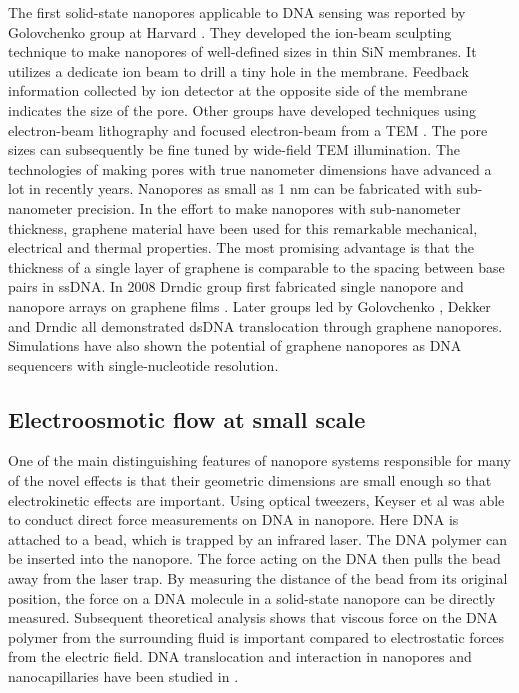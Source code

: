 The first solid-state nanopores applicable to DNA sensing was reported by Golovchenko group at Harvard \cite{Li2001}. They developed the ion-beam sculpting technique to make nanopores of well-defined sizes in thin SiN membranes. It utilizes a dedicate ion beam to drill a tiny hole in the membrane. Feedback information collected by ion detector at the opposite side of the membrane indicates the size of the pore. Other groups have developed techniques using electron-beam lithography and focused electron-beam from a TEM \cite{Dekker2003}. The pore sizes can subsequently be fine tuned by wide-field TEM illumination. The technologies of making pores with true nanometer dimensions have advanced a lot in recently years. Nanopores as small as 1 nm can be fabricated with sub-nanometer precision. In the effort to make nanopores with sub-nanometer thickness, graphene material have been used for this remarkable mechanical, electrical and thermal properties. The most promising advantage is that the thickness of a single layer of graphene is comparable to the spacing between base pairs in ssDNA. In 2008 Drndic group first fabricated single nanopore and nanopore arrays on graphene films \cite{fischbein2008electron}. Later groups led by Golovchenko \cite{Garaj2010}, Dekker \cite{Schneider2010} and Drndic \cite{Merchant2010} all demonstrated dsDNA translocation through graphene nanopores. Simulations have also shown the potential of graphene nanopores as DNA sequencers with single-nucleotide resolution.
\subsection{Electroosmotic flow at small scale}
One of the main distinguishing features of nanopore systems responsible for many of the novel effects is that their geometric dimensions are small enough so that electrokinetic effects are important. Using optical tweezers, Keyser et al \cite{Keyser2006,VanDorp2009} was able to conduct direct force measurements on DNA in nanopore. Here DNA is attached to a bead, which is trapped by an infrared laser. The DNA polymer can be inserted into the nanopore. The force acting on the DNA then pulls the bead away from the laser trap. By measuring the distance of the bead from its original position, the force on a DNA molecule in a solid-state nanopore can be directly measured. Subsequent theoretical analysis \cite{ghosal2006electrophoresis,ghosal2007effect,Ghosal2007} shows that viscous force on the DNA polymer from the surrounding fluid is important compared to electrostatic forces from the electric field. DNA translocation and interaction in nanopores and nanocapillaries have been studied in \cite{laohakunakorn2013dna,thacker2012studying,ghosal2012capstan}.

